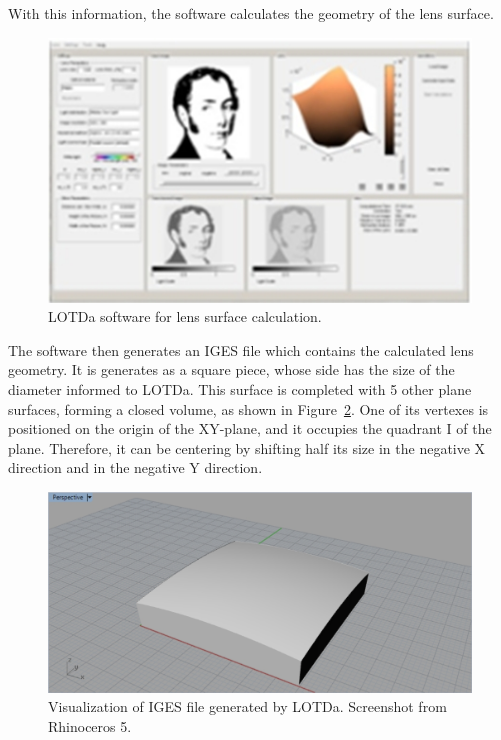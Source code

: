 	With this information, the software calculates the geometry of the lens surface.
	
	\begin{figure}[H]
		\centering
		\captionsetup{justification=centering}
		\includegraphics[width=0.9\linewidth]{Cap2/LOTDa/lotda_screenshot.jpg}
		\caption{LOTDa software for lens surface calculation.}
		\label{fig:lotda_screenshot}
	\end{figure}
	
	The software then generates an IGES file which contains the calculated lens geometry. It is generates as a square piece, whose side has the size of the diameter informed to LOTDa. This surface is completed with 5 other plane surfaces, forming a closed volume, as shown in Figure~\ref{fig:lotda_iges}. One of its vertexes is positioned on the origin of the XY-plane, and it occupies the quadrant I of the plane. Therefore, it can be centering by shifting half its size in the negative X direction and in the negative Y direction.
	
	\begin{figure}[H]
		\centering
		\captionsetup{justification=centering}
		\includegraphics[width=\linewidth]{Cap2/LOTDa/lotda_iges.jpg}
		\caption{Visualization of IGES file generated by LOTDa. Screenshot from Rhinoceros 5.}
		\label{fig:lotda_iges}
	\end{figure}